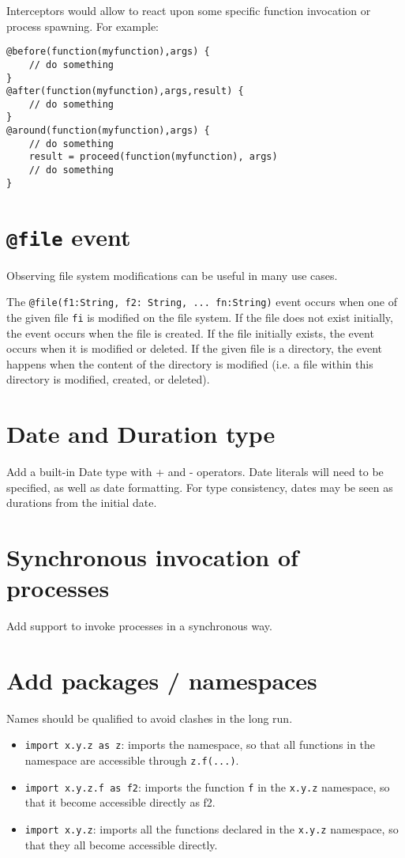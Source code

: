 \documentclass[11pt]{report}
\begin{document}
Interceptors would allow to react upon some specific function invocation or process spawning. For example:

\begin{lstlisting}[numbers=none]
@before(function(myfunction),args) {
	// do something
}
@after(function(myfunction),args,result) {
	// do something
}
@around(function(myfunction),args) {
	// do something
	result = proceed(function(myfunction), args)
	// do something
}
\end{lstlisting}

\section{\texttt{@file} event}

Observing file system modifications can be useful in many use cases.

The \texttt{@file(f1:String, f2: String, ... fn:String)} event occurs when one of the given file \texttt{fi} is modified on the file system. If the file does not exist initially, the event occurs when the file is created. If the file initially exists, the event occurs when it is modified or deleted. If the given file is a directory, the event happens when the content of the directory is modified (i.e. a file within this directory is modified, created, or deleted).

\section{Date and Duration type}

Add a built-in Date type with + and - operators. Date literals will need to be specified, as well as date formatting. For type consistency, dates may be seen as durations from the initial date.

\section{Synchronous invocation of processes}

Add support to invoke processes in a synchronous way.

\section{Add packages / namespaces}

Names should be qualified to avoid clashes in the long run.

\begin{itemize}
\item \texttt{import x.y.z as z}: imports the namespace, so that all functions in the namespace are accessible through \texttt{z.f(...)}.
\item \texttt{import x.y.z.f as f2}: imports the function \texttt{f} in the \texttt{x.y.z} namespace, so that it become accessible directly as f2.
\item \texttt{import x.y.z}: imports all the functions declared in the \texttt{x.y.z} namespace, so that they all become accessible directly.
\end{itemize}
\end{document}
